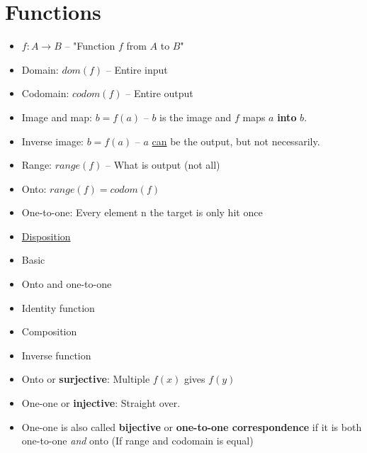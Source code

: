 \documentclass[english,10pt,a4paper]{article}
\begin{document}
\newpage
\section{Functions}

\begin{minipage}{0.7\linewidth}
\begin{theo}[Basic] 
\begin{itemize}
\item $f: A \rightarrow B$ -- "Function $f$ from $A$ to $B$"
\item Domain: $dom(f)$ -- Entire input
\item Codomain: $codom(f)$ -- Entire output
\item Image and map: $b=f(a)$ -- $b$ is the image and $f$ maps $a$ \textbf{into} $b$.
\item Inverse image: $b=f(a)$ -- $a$ \underline{can} be the output, but not necessarily.
\item Range: $range(f)$ -- What is output (not all)
\item Onto: $range(f) = codom(f)$
\item One-to-one: Every element n the target is only hit once
\end{itemize}
\end{theo}
\end{minipage}
\hspace{0.1cm}
\begin{minipage}{0.25\linewidth}
\begin{itemize}
\item \underline{Disposition}
\item Basic
\item Onto and one-to-one
\item Identity function
\item Composition
\item Inverse function
\end{itemize}
\end{minipage}


\begin{theo} 
\begin{itemize}
\item Onto or \textbf{surjective}: Multiple $f(x)$ gives $f(y)$
\item One-one or \textbf{injective}: Straight over.
\item One-one is also called \textbf{bijective} or \textbf{one-to-one correspondence} if it is both one-to-one \textit{and} onto (If range and codomain is equal)
\end{itemize}
\end{theo}
\end{document}
